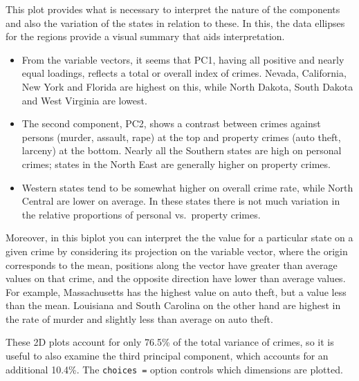 \documentclass[
  letterpaper,
  10pt,
  krantz2]{krantz}
\begin{document}
This plot provides what is necessary to interpret the nature of the
components and also the variation of the states in relation to these. In
this, the data ellipses for the regions provide a visual summary that
aids interpretation.

\begin{itemize}
\item
  From the variable vectors, it seems that PC1, having all positive and
  nearly equal loadings, reflects a total or overall index of crimes.
  Nevada, California, New York and Florida are highest on this, while
  North Dakota, South Dakota and West Virginia are lowest.
\item
  The second component, PC2, shows a contrast between crimes against
  persons (murder, assault, rape) at the top and property crimes (auto
  theft, larceny) at the bottom. Nearly all the Southern states are high
  on personal crimes; states in the North East are generally higher on
  property crimes.
\item
  Western states tend to be somewhat higher on overall crime rate, while
  North Central are lower on average. In these states there is not much
  variation in the relative proportions of personal vs.~property crimes.
\end{itemize}

Moreover, in this biplot you can interpret the the value for a
particular state on a given crime by considering its projection on the
variable vector, where the origin corresponds to the mean, positions
along the vector have greater than average values on that crime, and the
opposite direction have lower than average values. For example,
Massachusetts has the highest value on auto theft, but a value less than
the mean. Louisiana and South Carolina on the other hand are highest in
the rate of murder and slightly less than average on auto theft.

These 2D plots account for only 76.5\% of the total variance of crimes,
so it is useful to also examine the third principal component, which
accounts for an additional 10.4\%. The \texttt{choices\ =} option
controls which dimensions are plotted.
\end{document}
